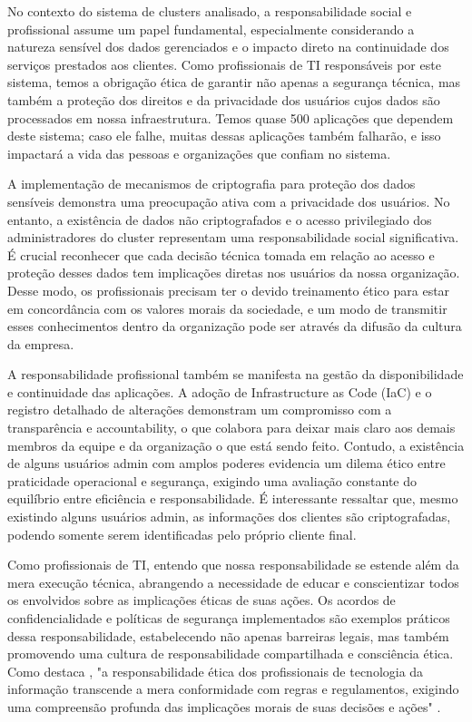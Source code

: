 No contexto do sistema de clusters analisado, a responsabilidade social e profissional assume um papel fundamental, especialmente considerando a natureza sensível dos dados gerenciados e o impacto direto na continuidade dos serviços prestados aos clientes. Como profissionais de TI responsáveis por este sistema, temos a obrigação ética de garantir não apenas a segurança técnica, mas também a proteção dos direitos e da privacidade dos usuários cujos dados são processados em nossa infraestrutura. Temos quase 500 aplicações que dependem deste sistema; caso ele falhe, muitas dessas aplicações também falharão, e isso impactará a vida das pessoas e organizações que confiam no sistema.

A implementação de mecanismos de criptografia para proteção dos dados sensíveis demonstra uma preocupação ativa com a privacidade dos usuários. No entanto, a existência de dados não criptografados e o acesso privilegiado dos administradores do cluster representam uma responsabilidade social significativa. É crucial reconhecer que cada decisão técnica tomada em relação ao acesso e proteção desses dados tem implicações diretas nos usuários da nossa organização. Desse modo, os profissionais precisam ter o devido treinamento ético para estar em concordância com os valores morais da sociedade, e um modo de transmitir esses conhecimentos dentro da organização pode ser através da difusão da cultura da empresa.

A responsabilidade profissional também se manifesta na gestão da disponibilidade e continuidade das aplicações. A adoção de Infrastructure as Code (IaC) e o registro detalhado de alterações demonstram um compromisso com a transparência e accountability, o que colabora para deixar mais claro aos demais membros da equipe e da organização o que está sendo feito. Contudo, a existência de alguns usuários admin com amplos poderes evidencia um dilema ético entre praticidade operacional e segurança, exigindo uma avaliação constante do equilíbrio entre eficiência e responsabilidade. É interessante ressaltar que, mesmo existindo alguns usuários admin, as informações dos clientes são criptografadas, podendo somente serem identificadas pelo próprio cliente final.

Como profissionais de TI, entendo que nossa responsabilidade se estende além da mera execução técnica, abrangendo a necessidade de educar e conscientizar todos os envolvidos sobre as implicações éticas de suas ações. Os acordos de confidencialidade e políticas de segurança implementados são exemplos práticos dessa responsabilidade, estabelecendo não apenas barreiras legais, mas também promovendo uma cultura de responsabilidade compartilhada e consciência ética. Como destaca \citeauthor{mason1986ethical}, "a responsabilidade ética dos profissionais de tecnologia da informação transcende a mera conformidade com regras e regulamentos, exigindo uma compreensão profunda das implicações morais de suas decisões e ações" \cite{mason1986ethical}.
